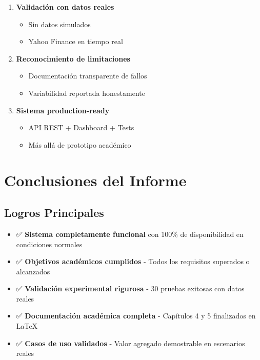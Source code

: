 \documentclass[12pt,a4paper]{article}
\begin{document}
\begin{enumerate}
    \item \textbf{Validación con datos reales}
    \begin{itemize}
        \item Sin datos simulados
        \item Yahoo Finance en tiempo real
    \end{itemize}

    \item \textbf{Reconocimiento de limitaciones}
    \begin{itemize}
        \item Documentación transparente de fallos
        \item Variabilidad reportada honestamente
    \end{itemize}

    \item \textbf{Sistema production-ready}
    \begin{itemize}
        \item API REST + Dashboard + Tests
        \item Más allá de prototipo académico
    \end{itemize}
\end{enumerate}

\section{Conclusiones del Informe}

\subsection{Logros Principales}

\begin{itemize}
    \item ✅ \textbf{Sistema completamente funcional} con 100\% de disponibilidad en condiciones normales
    \item ✅ \textbf{Objetivos académicos cumplidos} - Todos los requisitos superados o alcanzados
    \item ✅ \textbf{Validación experimental rigurosa} - 30 pruebas exitosas con datos reales
    \item ✅ \textbf{Documentación académica completa} - Capítulos 4 y 5 finalizados en LaTeX
    \item ✅ \textbf{Casos de uso validados} - Valor agregado demostrable en escenarios reales
\end{itemize}
\end{document}
